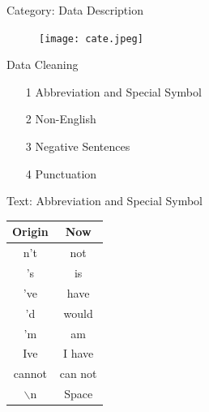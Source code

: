 \documentclass[10pt]{beamer}
\begin{document}
\begin{frame}{Category: Data Description}
\begin{figure}
    \centering
    \texttt{[image: cate.jpeg]}
    
\end{figure}    
\end{frame}


\begin{frame}{Data Cleaning}


\begin{itemize}

	\item[1] Abbreviation and Special Symbol

	\item[2] Non-English

	\item[3] Negative Sentences
	
	\item[4] Punctuation

\end{itemize}

\end{frame}



\begin{frame}{Text: Abbreviation and Special Symbol}

\begin{table}[ht]

\centering %
\begin{tabular}{c c} %
\hline %
Origin & Now \\ [0.5ex] %
\hline %
n't &   not\\  
's &   is\\  
've &   have\\  
'd &   would\\  
'm &   am\\  
Ive &  I have\\  
cannot &  can not\\
$\backslash$n & Space \\
\hline %
\end{tabular}
\label{table:nonlin} %
\end{table}
\end{frame}
\end{document}
